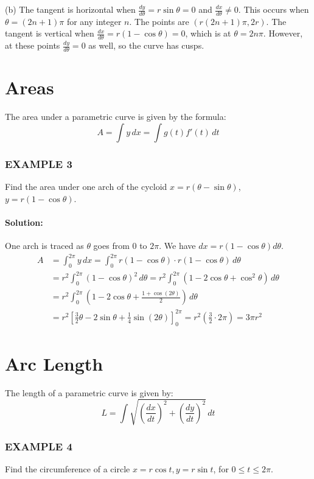 \documentclass{article}
\begin{document}
(b) The tangent is horizontal when $\frac{dy}{d\theta}=r\sin\theta=0$ and $\frac{dx}{d\theta} \neq 0$. This occurs when $\theta = (2n+1)\pi$ for any integer $n$. The points are $(r(2n+1)\pi, 2r)$. The tangent is vertical when $\frac{dx}{d\theta}=r(1-\cos\theta)=0$, which is at $\theta=2n\pi$. However, at these points $\frac{dy}{d\theta}=0$ as well, so the curve has cusps.

\section*{Areas}
The area under a parametric curve is given by the formula:
\[
A = \int y \, dx = \int g(t)f'(t) \, dt
\]

\subsubsection*{EXAMPLE 3}
Find the area under one arch of the cycloid $x=r(\theta-\sin\theta)$, $y=r(1-\cos\theta)$.

\paragraph{Solution:}
One arch is traced as $\theta$ goes from $0$ to $2\pi$. We have $dx = r(1-\cos\theta)d\theta$.
\begin{align*}
    A &= \int_{0}^{2\pi} y \, dx = \int_{0}^{2\pi} r(1-\cos\theta) \cdot r(1-\cos\theta) \, d\theta \\
    &= r^2 \int_{0}^{2\pi} (1-\cos\theta)^2 \, d\theta = r^2 \int_{0}^{2\pi} (1 - 2\cos\theta + \cos^2\theta) \, d\theta \\
    &= r^2 \int_{0}^{2\pi} \left(1 - 2\cos\theta + \frac{1+\cos(2\theta)}{2}\right) \, d\theta \\
    &= r^2 \left[ \frac{3}{2}\theta - 2\sin\theta + \frac{1}{4}\sin(2\theta) \right]_{0}^{2\pi} = r^2 \left( \frac{3}{2} \cdot 2\pi \right) = 3\pi r^2
\end{align*}

\section*{Arc Length}
The length of a parametric curve is given by:
\[
L = \int \sqrt{\left(\frac{dx}{dt}\right)^2 + \left(\frac{dy}{dt}\right)^2} \, dt
\]

\subsubsection*{EXAMPLE 4}
Find the circumference of a circle $x=r\cos t, y=r\sin t$, for $0 \le t \le 2\pi$.
\end{document}
